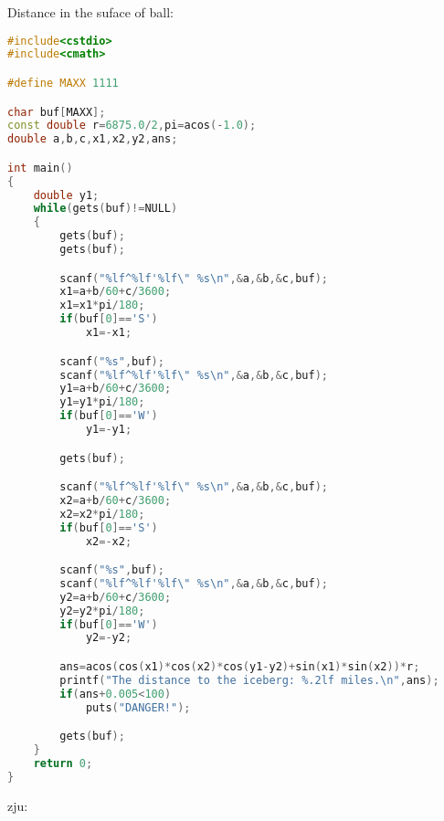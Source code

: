 Distance in the suface of ball:
\begin{lstlisting}[language=C++]
#include<cstdio>
#include<cmath>

#define MAXX 1111

char buf[MAXX];
const double r=6875.0/2,pi=acos(-1.0);
double a,b,c,x1,x2,y2,ans;

int main()
{
    double y1;
    while(gets(buf)!=NULL)
    {
        gets(buf);
        gets(buf);

        scanf("%lf^%lf'%lf\" %s\n",&a,&b,&c,buf);
        x1=a+b/60+c/3600;
        x1=x1*pi/180;
        if(buf[0]=='S')
            x1=-x1;

        scanf("%s",buf);
        scanf("%lf^%lf'%lf\" %s\n",&a,&b,&c,buf);
        y1=a+b/60+c/3600;
        y1=y1*pi/180;
        if(buf[0]=='W')
            y1=-y1;

        gets(buf);

        scanf("%lf^%lf'%lf\" %s\n",&a,&b,&c,buf);
        x2=a+b/60+c/3600;
        x2=x2*pi/180;
        if(buf[0]=='S')
            x2=-x2;

        scanf("%s",buf);
        scanf("%lf^%lf'%lf\" %s\n",&a,&b,&c,buf);
        y2=a+b/60+c/3600;
        y2=y2*pi/180;
        if(buf[0]=='W')
            y2=-y2;

        ans=acos(cos(x1)*cos(x2)*cos(y1-y2)+sin(x1)*sin(x2))*r;
        printf("The distance to the iceberg: %.2lf miles.\n",ans);
        if(ans+0.005<100)
            puts("DANGER!");

        gets(buf);
    }
    return 0;
}
\end{lstlisting}

zju:
